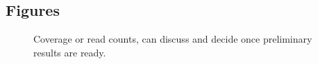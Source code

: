 \documentclass{bmcart}
\begin{document}
\begin{backmatter}


\section*{Figures}
\begin{figure}[h!]
\caption{ Coverage or read counts, can discuss and decide once preliminary results are ready.}
\label{fCoverage}
\end{figure}
%



\end{backmatter}
\end{document}
